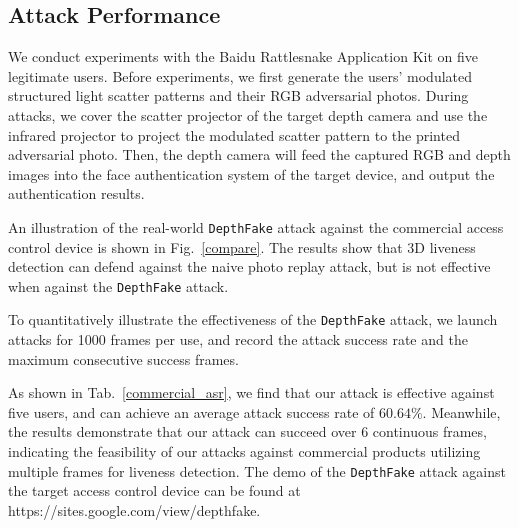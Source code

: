 
\subsection{Attack Performance}
We conduct experiments with the Baidu Rattlesnake Application Kit on five legitimate users.
Before experiments, we first generate the users' modulated structured light scatter patterns and their RGB adversarial photos.
During attacks, we cover the scatter projector of the target depth camera and use the infrared projector to project the modulated scatter pattern to the printed adversarial photo. Then, the depth camera will feed the captured RGB and depth images into the face authentication system of the target device, and output the authentication results.

An illustration of the real-world \texttt{DepthFake} attack against the commercial access control device is shown in Fig.~\ref{compare}. The results show that 3D liveness detection can defend against the naive photo replay attack, but is not effective when against the \texttt{DepthFake} attack. 

To quantitatively illustrate the effectiveness of the \texttt{DepthFake} attack,  we launch attacks for 1000 frames per use, and record the attack success rate and the maximum consecutive success frames.

As shown in Tab.~\ref{commercial_asr}, we find that our attack is effective against five users, and can achieve an average attack success rate of $60.64\%$. 
Meanwhile, the results demonstrate that our attack can succeed over 6 continuous frames, indicating the feasibility of our attacks against commercial products utilizing multiple frames for liveness detection.  The demo of the  \texttt{DepthFake} attack against the target access control device can be found at https://sites.google.com/view/depthfake.

